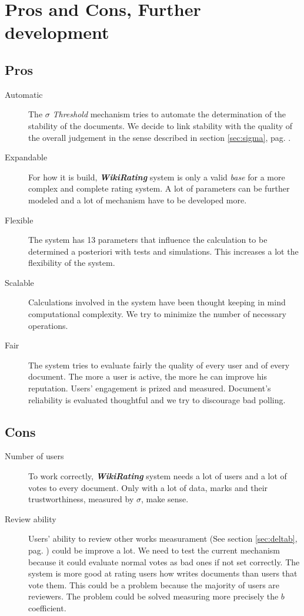 \documentclass[a4paper,11pt]{article}
\newcommand{\wir}{\textbf{\textit{WikiRating }}}
\newcommand{\sg}{$\sigma$ }
\begin{document}
\newpage
\section{Pros and Cons, Further development}
\subsection{Pros}
\begin{description}
\item[Automatic] The \sg \emph{Threshold} mechanism tries to automate the determination of the stability of the documents. We decide to link stability with the quality of the overall judgement in the sense described in section \ref{sec:sigma}, pag. \pageref{sec:sigma}.
\item[Expandable] For how it is build, \wir system is only a valid \emph{base} for a more complex and complete rating system. A lot of parameters can be further modeled and a lot of mechanism have to be developed more.
\item[Flexible] The system has 13 parameters that influence the calculation to be determined a posteriori with tests and simulations. This increases a lot the flexibility of the system.
\item [Scalable] Calculations involved in the system have been thought keeping in mind computational complexity. We try to minimize the number of necessary operations.
\item [Fair] The system tries to evaluate fairly the quality of every user and of every document. The more a user is active, the more he can improve his reputation. Users' engagement is prized and measured. Document's reliability is evaluated thoughtful and we try to discourage bad polling.
\end{description}

\subsection{Cons}
\begin{description}
\item[Number of users] To work correctly, \wir system needs a lot of users and a lot of votes to every document. Only with a lot of data, marks and their trustworthiness, measured by $\sigma$, make sense.
\item[Review ability] Users' ability to review other works measurament (See section \ref{sec:deltab}, pag. \pageref{sec:deltab}) could be improve a lot. We need to test the current mechanism because it could evaluate normal votes as bad ones if not set correctly. The system is more good at rating users how writes documents than users that vote them. This could be a problem because the majority of users are reviewers. The problem could be solved measuring more precisely the $b$ coefficient. 
\end{description}
\end{document}
